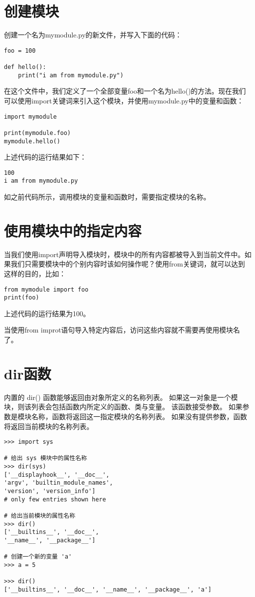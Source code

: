 \section{创建模块}
创建一个名为mymodule.py的新文件，并写入下面的代码：

\begin{lstlisting}
foo = 100

def hello():
    print("i am from mymodule.py")
\end{lstlisting}
在这个文件中，我们定义了一个全部变量foo和一个名为hello()的方法。现在我们可以使用import关键词来引入这个模块，并使用mymodule.py中的变量和函数：

\begin{lstlisting}
import mymodule

print(mymodule.foo)
mymodule.hello()
\end{lstlisting}

上述代码的运行结果如下：

\begin{lstlisting}
100
i am from mymodule.py
\end{lstlisting}

如之前代码所示，调用模块的变量和函数时，需要指定模块的名称。

\section{使用模块中的指定内容}
当我们使用import声明导入模块时，模块中的所有内容都被导入到当前文件中。如果我们只需要模块中的个别内容时该如何操作呢？使用from关键词，就可以达到这样的目的，比如：

\begin{lstlisting}
from mymodule import foo
print(foo)
\end{lstlisting}
上述代码的运行结果为100。
\begin{myremark}{}
当使用from improt语句导入特定内容后，访问这些内容就不需要再使用模块名了。
\end{myremark}

\section{dir函数} %
\label{sec:dir函数}
内置的 dir() 函数能够返回由对象所定义的名称列表。 如果这一对象是一个模块，则该列表会包括函数内所定义的函数、类与变量。
该函数接受参数。 如果参数是模块名称，函数将返回这一指定模块的名称列表。 如果没有提供参数，函数将返回当前模块的名称列表。

\begin{lstlisting}
>>> import sys

# 给出 sys 模块中的属性名称
>>> dir(sys)
['__displayhook__', '__doc__',
'argv', 'builtin_module_names',
'version', 'version_info']
# only few entries shown here

# 给出当前模块的属性名称
>>> dir()
['__builtins__', '__doc__',
'__name__', '__package__']

# 创建一个新的变量 'a'
>>> a = 5

>>> dir()
['__builtins__', '__doc__', '__name__', '__package__', 'a']
\end{lstlisting}

